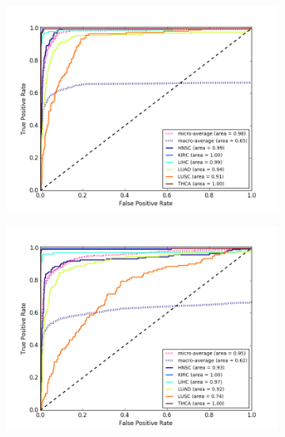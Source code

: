 \begin{figure}[H]
     \centering
     \begin{subfigure}[b]{0.49\textwidth}
         \centering
         \includegraphics[width=\textwidth]{img/m_s/m_s_sdae_dgmu_roc.png}
         \caption{}
     \end{subfigure}
     \hfill
     \begin{subfigure}[b]{0.49\textwidth}
         \centering
         \includegraphics[width=\textwidth]{img/m_s/m_s_sdae_gmu_roc.png}
         \caption{}
     \end{subfigure}
     \hfill
     \begin{subfigure}[b]{0.49\textwidth}
         \centering

\end{subfigure}
\end{figure}
